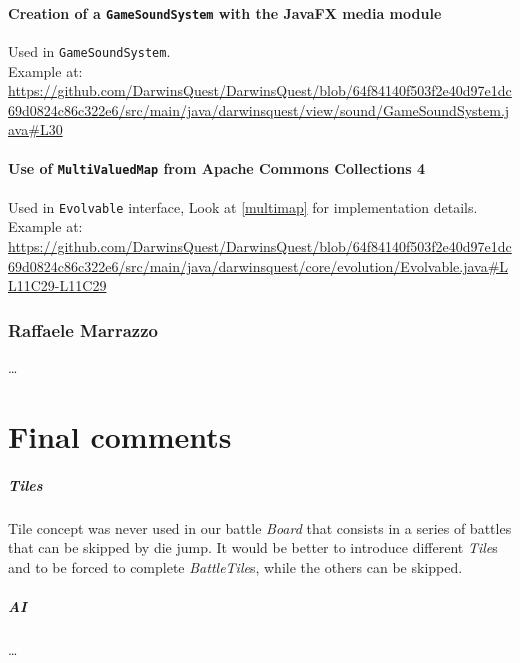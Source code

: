 \documentclass[12pt, a4paper]{report}
\theoremstyle{definition}
\begin{document}

    \subsubsection{Creation of a \texttt{GameSoundSystem} with the JavaFX media module}
    Used in \verb|GameSoundSystem|.\\
    Example at: \url{https://github.com/DarwinsQuest/DarwinsQuest/blob/64f84140f503f2e40d97e1dc69d0824c86c322e6/src/main/java/darwinsquest/view/sound/GameSoundSystem.java#L30}

    \subsubsection{Use of \texttt{MultiValuedMap} from Apache Commons Collections 4}
    Used in \verb|Evolvable| interface, Look at \ref{multimap} for implementation details.\\
    Example at: \url{https://github.com/DarwinsQuest/DarwinsQuest/blob/64f84140f503f2e40d97e1dc69d0824c86c322e6/src/main/java/darwinsquest/core/evolution/Evolvable.java#LL11C29-L11C29}

    \subsection*{Raffaele Marrazzo}

    \dots

\chapter{Final comments}

    \paragraph{Tiles}
    Tile concept was never used in our battle \emph{Board} that consists in a series of battles that can be skipped by die jump.
    It would be better to introduce different \emph{Tile}s and to be forced to complete \emph{BattleTile}s, while the others can be skipped.

    \paragraph{AI}
    \dots
\end{document}

